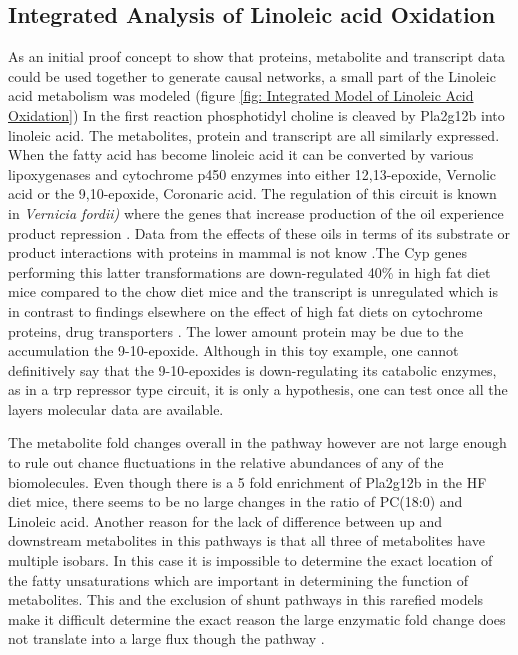 \documentclass[a4paper]{book}
\begin{document}
	\subsection{Integrated Analysis of Linoleic acid Oxidation}
	As an initial proof concept to show that proteins, metabolite and transcript data could be used together to generate causal networks, a small part of the Linoleic acid metabolism was modeled (figure \ref{fig: Integrated Model of Linoleic Acid Oxidation})	In the first reaction phosphotidyl choline is cleaved by Pla2g12b into linoleic acid. The metabolites, protein and transcript are all similarly expressed. When the fatty acid has become linoleic acid it can be converted by various lipoxygenases and cytochrome p450 enzymes into either 12,13-epoxide, Vernolic acid or the  9,10-epoxide, Coronaric acid. The regulation of this circuit is known in \textit{Vernicia fordii)} where the genes that increase production of the oil experience product repression \citep{Li2010Vernonia}. Data from the effects of these oils in terms of its substrate or product interactions with proteins in mammal is not know .The Cyp genes performing this latter transformations are down-regulated 40\% in high fat diet mice compared to the chow diet mice and the transcript is unregulated which is in contrast to findings elsewhere on the effect of high fat diets on cytochrome proteins, drug transporters \citep{Ghose2011HFD}. The lower amount protein may be due to the accumulation the 9-10-epoxide. Although in this toy example, one cannot definitively say that the 9-10-epoxides is down-regulating its catabolic enzymes, as in a trp repressor type circuit, it is only a hypothesis, one can test once all the layers molecular data are available. 
	
	The metabolite fold changes overall in the pathway however are not large enough to rule out chance fluctuations in the relative abundances of any of the biomolecules. Even though there is a 5 fold enrichment of Pla2g12b in the HF diet mice, there seems to be no large changes in the ratio of PC(18:0) and Linoleic acid. Another reason for the lack of difference between up and downstream metabolites in this pathways is that all three of metabolites have multiple isobars. In this case it is impossible to determine the exact location of the fatty unsaturations which are important in determining the function of metabolites. This and the exclusion of shunt pathways in this rarefied models make it difficult determine the exact reason the large enzymatic fold change does not translate into a large flux though the pathway \citep{Saa2016}.
	
\end{document}

